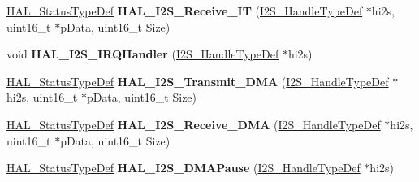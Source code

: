 \begin{DoxyCompactItemize}
\hyperlink{stm32f4xx__hal__def_8h_a63c0679d1cb8b8c684fbb0632743478f}{H\+A\+L\+\_\+\+Status\+Type\+Def} {\bfseries H\+A\+L\+\_\+\+I2\+S\+\_\+\+Receive\+\_\+\+IT} (\hyperlink{group___i2_s___exported___types_ga859f888192a094b456619601937580f5}{I2\+S\+\_\+\+Handle\+Type\+Def} $\ast$hi2s, uint16\+\_\+t $\ast$p\+Data, uint16\+\_\+t Size)
\item 
\mbox{\label{group___i2_s___exported___functions___group2_gad5fe9157152a3c5baac47b877d534f4e}} 
void {\bfseries H\+A\+L\+\_\+\+I2\+S\+\_\+\+I\+R\+Q\+Handler} (\hyperlink{group___i2_s___exported___types_ga859f888192a094b456619601937580f5}{I2\+S\+\_\+\+Handle\+Type\+Def} $\ast$hi2s)
\item 
\mbox{\label{group___i2_s___exported___functions___group2_ga97fa0c086e3980597e1e3962b2dfc322}} 
\hyperlink{stm32f4xx__hal__def_8h_a63c0679d1cb8b8c684fbb0632743478f}{H\+A\+L\+\_\+\+Status\+Type\+Def} {\bfseries H\+A\+L\+\_\+\+I2\+S\+\_\+\+Transmit\+\_\+\+D\+MA} (\hyperlink{group___i2_s___exported___types_ga859f888192a094b456619601937580f5}{I2\+S\+\_\+\+Handle\+Type\+Def} $\ast$hi2s, uint16\+\_\+t $\ast$p\+Data, uint16\+\_\+t Size)
\item 
\mbox{\label{group___i2_s___exported___functions___group2_gaadf898fd8ef5c8349c3a61c2e3e7720e}} 
\hyperlink{stm32f4xx__hal__def_8h_a63c0679d1cb8b8c684fbb0632743478f}{H\+A\+L\+\_\+\+Status\+Type\+Def} {\bfseries H\+A\+L\+\_\+\+I2\+S\+\_\+\+Receive\+\_\+\+D\+MA} (\hyperlink{group___i2_s___exported___types_ga859f888192a094b456619601937580f5}{I2\+S\+\_\+\+Handle\+Type\+Def} $\ast$hi2s, uint16\+\_\+t $\ast$p\+Data, uint16\+\_\+t Size)
\item 
\mbox{\label{group___i2_s___exported___functions___group2_ga374ecf3a61ff460938af93e9b788f09b}} 
\hyperlink{stm32f4xx__hal__def_8h_a63c0679d1cb8b8c684fbb0632743478f}{H\+A\+L\+\_\+\+Status\+Type\+Def} {\bfseries H\+A\+L\+\_\+\+I2\+S\+\_\+\+D\+M\+A\+Pause} (\hyperlink{group___i2_s___exported___types_ga859f888192a094b456619601937580f5}{I2\+S\+\_\+\+Handle\+Type\+Def} $\ast$hi2s)
\item 
\mbox{\label{group___i2_s___exported___functions___group2_gaa86501283bd6988e4106af51cda75945}} 

\end{DoxyCompactItemize}
